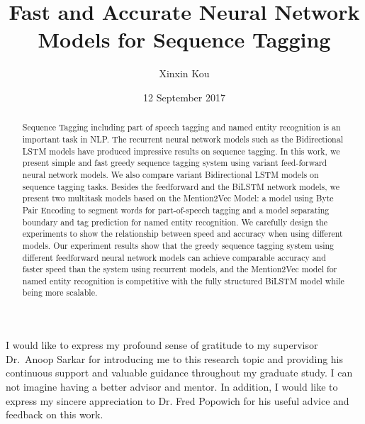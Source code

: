 \documentclass{sfuthesis}
\title{Fast and Accurate Neural Network Models for Sequence Tagging}
\author{Xinxin Kou}
\date{12 September 2017}
\begin{document}
\frontmatter
\maketitle{}
\makecommittee{}

\begin{abstract}
Sequence Tagging including part of speech tagging and named entity recognition is an important task in NLP. The recurrent neural network models such as the Bidirectional LSTM models have produced impressive results on sequence tagging. In this work, we present simple and fast greedy sequence tagging system using variant feed-forward neural network models. We also compare variant Bidirectional LSTM models on sequence tagging tasks. Besides the feedforward and the BiLSTM network models, we present two multitask models based on the Mention2Vec Model: a model using Byte Pair Encoding to segment words for part-of-speech tagging and a model separating boundary and tag prediction for named entity recognition. We carefully design the experiments to show the relationship between speed and accuracy when using different models. Our experiment results show that the greedy sequence tagging system using different feedforward neural network models can achieve comparable accuracy and faster speed than the system using recurrent models, and the Mention2Vec model for named entity recognition is competitive with the fully structured BiLSTM model while being more scalable.

\end{abstract}


\begin{acknowledgements} %

I would like to express my profound sense of gratitude to my supervisor Dr.\ Anoop Sarkar for introducing me to this research
topic and providing his continuous support and valuable guidance throughout my graduate study. I can not imagine having a better advisor and mentor. In addition, I would like to express my sincere appreciation to Dr. Fred Popowich for his useful advice and feedback on this work.




\end{acknowledgements}

\tableofcontents\clearpage
{}\listoftables\clearpage
{}\listoffigures





%
%
\end{document}
